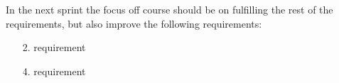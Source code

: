 In the next sprint the focus off course should be on fulfilling the rest of the requirements, but also improve the following requirements:
\begin{itemize}
\item[2.] requirement
\item[4.] requirement
\end{itemize}